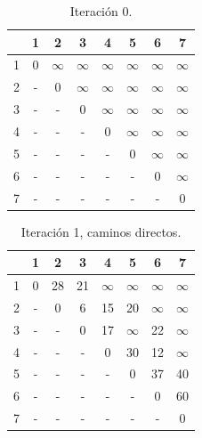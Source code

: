 \documentclass[letterpaper,10pt]{article}
\begin{document}
\begin{enumerate}
        \begin{minipage}[t]{0.47\textwidth}
            \begin{table}[H]
                \centering
            \begin{tabular}{|c|c|c|c|c|c|c|c|}\hline
                   & 1 & 2 & 3 & 4 & 5 & 6 & 7   \\ \hline
                 1 & $0$ & $\infty$ & $\infty$ & $\infty$ & $\infty$ & $\infty$ & $\infty$      \\\hline
                 2 & -  & 0  & $\infty$  & $\infty$  & $\infty$  & $\infty$  & $\infty$   \\\hline
                 3 & -  & -  & 0  & $\infty$  & $\infty$  & $\infty$  & $\infty$   \\\hline
                 4 & -  & -  & -  & 0  & $\infty$  & $\infty$  & $\infty$   \\\hline
                 5 & -  & -  & -  & -  & 0  & $\infty$  & $\infty$  \\\hline
                 6 & -  & -  & -  & -  & -  & 0  & $\infty$   \\\hline
                 7 & -  & -  & -  & -  & -  & -  & 0   \\\hline
                \end{tabular}
                \caption{Iteración 0.}
                \label{tablitafloyd0}
            \end{table}
        \end{minipage}
        \begin{minipage}[t]{0.47\textwidth}
            \begin{table}[H]
                \centering
            \begin{tabular}{|c|c|c|c|c|c|c|c|}\hline
                   & 1 & 2 & 3 & 4 & 5 & 6 & 7   \\ \hline
                 1 & $0$ & 28 & 21 & $\infty$ & $\infty$ & $\infty$ & $\infty$      \\\hline
                 2 & -  & 0  & 6  & 15  & 20  & $\infty$  & $\infty$   \\\hline
                 3 & -  & -  & 0  & 17  & $\infty$  & 22  & $\infty$   \\\hline
                 4 & -  & -  & -  & 0  & 30  & 12  & $\infty$   \\\hline
                 5 & -  & -  & -  & -  & 0  & 37  & 40  \\\hline
                 6 & -  & -  & -  & -  & -  & 0  & 60   \\\hline
                 7 & -  & -  & -  & -  & -  & -  & 0   \\\hline
                \end{tabular}
                \caption{Iteración 1, caminos directos.}
                \label{tablitafloyd1}
            \end{table}
        \end{minipage}


\end{enumerate}
\end{document}
